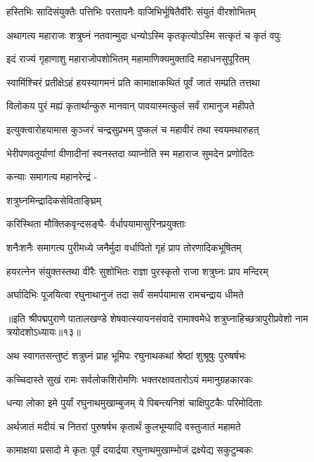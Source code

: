 \twolineshloka
{हस्तिभिः सादिसंयुक्तैः पत्तिभिः परतापनैः}
{वाजिभिर्भूषितैर्वीरैः संयुतं वीरशोभितम्}%

\twolineshloka
{अथागत्य महाराजः शत्रुघ्नं नतवान्मुदा}
{धन्योऽस्मि कृतकृत्योऽस्मि सत्कृतं च कृतं वपुः}%

\twolineshloka
{इदं राज्यं गृहाणाशु महाराजोपशोभितम्}
{महामाणिक्यमुक्तादि महाधनसुपूरितम्}%

\twolineshloka
{स्वामिंश्चिरं प्रतीक्षेऽहं हयस्यागमनं प्रति}
{कामाक्षाकथितं पूर्वं जातं सम्प्रति तत्तथा}%

\twolineshloka
{विलोकय पुरं मह्यं कृतार्थान्कुरु मानवान्}
{पावयास्मत्कुलं सर्वं रामानुज महीपते}%

\twolineshloka
{इत्युक्त्वारोहयामास कुञ्जरं चन्द्रसुप्रभम्}
{पुष्कलं च महावीरं तथा स्वयमथारुहत्}%

\twolineshloka
{भेरीपणवतूर्याणां वीणादीनां स्वनस्तदा}
{व्याप्नोति स्म महाराज सुमदेन प्रणोदितः}%

कन्याः समागत्य महानरेन्द्रं -

शत्रुघ्नमिन्द्रादिकसेविताङ्घ्रिम्

\twolineshloka
{करिस्थिता मौक्तिकवृन्दसङ्घै-}
{र्वर्धापयामासुरिनप्रयुक्ताः}%

\twolineshloka
{शनैःशनैः समागत्य पुरीमध्ये जनैर्मुदा}
{वर्धापितो गृहं प्राप तोरणादिकभूषितम्}%

\twolineshloka
{हयरत्नेन संयुक्तस्तथा वीरैः सुशोभितः}
{राज्ञा पुरस्कृतो राजा शत्रुघ्नः प्राप मन्दिरम्}%

\twolineshloka
{अर्घादिभिः पूजयित्वा रघुनाथानुजं तदा}
{सर्वं समर्पयामास रामचन्द्राय धीमते}%

{॥इति श्रीपद्मपुराणे पातालखण्डे शेषवात्स्यायनसंवादे रामाश्वमेधे शत्रुघ्नाहिच्छत्रापुरीप्रवेशो नाम त्रयोदशोऽध्यायः॥१३॥}



\twolineshloka
{अथ स्वागतसन्तुष्टं शत्रुघ्नं प्राह भूमिपः}
{रघुनाथकथां श्रेष्ठां शुश्रूषुः पुरुषर्षभः}%


\twolineshloka
{कच्चिदास्ते सुखं रामः सर्वलोकशिरोमणिः}
{भक्तरक्षावतारोऽयं ममानुग्रहकारकः}%

\twolineshloka
{धन्या लोका इमे पुर्यां रघुनाथमुखाम्बुजम्}
{ये पिबन्त्यनिशं चाक्षिपुटकैः परिमोदिताः}%

\twolineshloka
{अर्थजातं मदीयं च नितरां पुरुषर्षभ}
{कृतार्थं कुलभूम्यादि वस्तुजातं महामते}%

\twolineshloka
{कामाक्षया प्रसादो मे कृतः पूर्वं दयार्द्रया}
{रघुनाथमुखाम्भोजं द्रक्ष्येद्य सकुटुम्बकः}%

